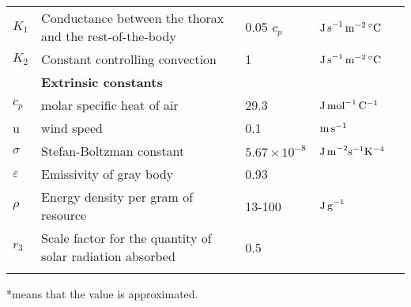 \begin{sidewaystable}
\begin{tabular}{l l l l l}
$K_1$& Conductance between the thorax and the rest-of-the-body & 0.05 $c_p$ & $\rm{J \,s}^{-1} \, \rm{m}^{-2} \, ^{\circ}\rm{C}$  & \citet{Campbell2012} \\
$K_2$& Constant controlling convection & 1   & $\rm{J \,s}^{-1} \, \rm{m}^{-2} \, ^{\circ}\rm{C}$  & \citet{Campbell2012} \\
& \textbf{Extrinsic constants} & & &  \\
$c_p$ & molar specific heat of air  & 29.3 &  $\rm{J \, mol}^ {-1} \, \rm{C}^ {-1}$ & \citet{Campbell2012} \\
u &  wind speed & 0.1 & $\rm{m \, s}^{-1}$ & \\
$\sigma$ & Stefan-Boltzman constant & $5.67 \times 10^{-8}$ &  $\rm{J \, m}^{-2} \rm{s}^{-1} \rm{K}^{-4}  $  &  \\
$\varepsilon$& Emissivity of gray body & 0.93& & \citep{Campbell2012} \\
$\rho$ &Energy density per gram of resource & 13-100 &  $\rm{J \, g}^{-1}$  &  \\  %
$r_3$  & Scale factor for the quantity of solar radiation absorbed & 0.5 &  &  \\
\hline
\label{table:table1}
\end{tabular}
\raggedright{*means that the value is approximated.}
\end{sidewaystable}
